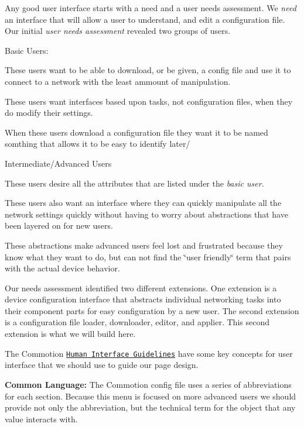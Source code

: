 Any good user interface starts with a need and a user needs assessment. We {\itshape need} an interface that will allow a user to understand, and edit a configuration file. Our initial {\itshape user needs assessment} revealed two groups of users.

Basic Users\-:
\begin{DoxyItemize}
\item These users want to be able to download, or be given, a config file and use it to connect to a network with the least ammount of manipulation.
\item These users want interfaces based upon tasks, not configuration files, when they do modify their settings.
\item When these users download a configuration file they want it to be named somthing that allows it to be easy to identify later/
\end{DoxyItemize}

Intermediate/\-Advanced Users
\begin{DoxyItemize}
\item These users desire all the attributes that are listed under the {\itshape basic user.}
\item These users also want an interface where they can quickly manipulate all the network settings quickly without having to worry about abstractions that have been layered on for new users.
\begin{DoxyItemize}
\item These abstractions make advanced users feel lost and frustrated because they know what they want to do, but can not find the \char`\"{}user friendly\char`\"{} term that pairs with the actual device behavior.
\end{DoxyItemize}
\end{DoxyItemize}

Our needs assessment identified two different extensions. One extension is a device configuration interface that abstracts individual networking tasks into their component parts for easy configuration by a new user. The second extension is a configuration file loader, downloader, editor, and applier. This second extension is what we will build here.

The Commotion \href{http://commotionwireless.net/developer/hig/key-concepts}{\tt Human Interface Guidelines} have some key concepts for user interface that we should use to guide our page design.

{\bfseries Common Language\-:} The Commotion config file uses a series of abbreviations for each section. Because this menu is focused on more advanced users we should provide not only the abbreviation, but the technical term for the object that any value interacts with.

